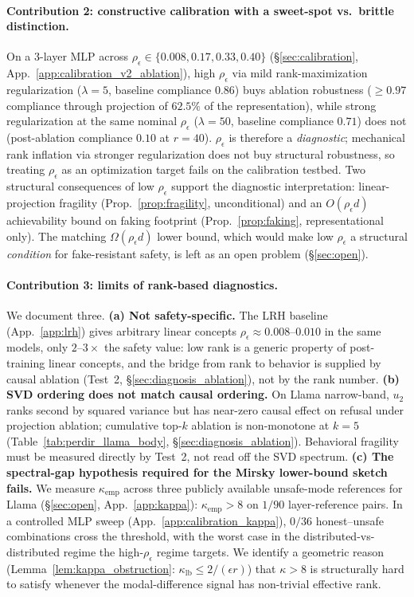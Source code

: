 \documentclass[10pt]{article}
\theoremstyle{definition}
\theoremstyle{remark}
\begin{document}
\paragraph{Contribution 2: constructive calibration with
a sweet-spot vs.\ brittle distinction.}
On a 3-layer MLP across $\rho_{\epsilon} \in \{0.008,
0.17, 0.33, 0.40\}$
(\S\ref{sec:calibration},
App.~\ref{app:calibration_v2_ablation}), high
$\rho_{\epsilon}$ via mild rank-maximization
regularization ($\lambda=5$, baseline compliance $0.86$)
buys ablation robustness ($\geq 0.97$ compliance
through projection of $62.5\%$ of the representation),
while strong regularization at the same nominal
$\rho_{\epsilon}$ ($\lambda=50$, baseline compliance
$0.71$) does not (post-ablation compliance $0.10$ at
$r=40$).  $\rho_{\epsilon}$ is therefore a
\emph{diagnostic}; mechanical rank inflation via stronger
regularization does not buy structural robustness, so
treating $\rho_{\epsilon}$ as an optimization target
fails on the calibration testbed.
Two structural consequences of low $\rho_{\epsilon}$
support the diagnostic interpretation:
linear-projection fragility
(Prop.~\ref{prop:fragility}, unconditional) and an
$O(\rho_{\epsilon}d)$ achievability bound on faking
footprint
(Prop.~\ref{prop:faking}, representational only).  The
matching $\Omega(\rho_{\epsilon}d)$ lower bound, which
would make low $\rho_{\epsilon}$ a structural
\emph{condition} for fake-resistant safety, is left as
an open problem (\S\ref{sec:open}).

\paragraph{Contribution 3: limits of rank-based
diagnostics.}
We document three.  \textbf{(a) Not safety-specific.}
The LRH baseline (App.~\ref{app:lrh}) gives arbitrary
linear concepts $\rho_{\epsilon} \approx 0.008$--$0.010$
in the same models, only $2$--$3\times$ the safety
value: low rank is a generic property of post-training
linear concepts, and the bridge from rank to behavior
is supplied by causal ablation (Test~2,
\S\ref{sec:diagnosis_ablation}), not by the rank number.
\textbf{(b) SVD ordering does not match causal
ordering.}  On Llama narrow-band, $u_2$ ranks second by
squared variance but has near-zero causal effect
on refusal under projection ablation; cumulative
top-$k$ ablation is non-monotone at $k=5$
(Table~\ref{tab:perdir_llama_body},
\S\ref{sec:diagnosis_ablation}).  Behavioral fragility
must be measured directly by Test~2, not read off the
SVD spectrum.
\textbf{(c) The spectral-gap hypothesis required for the
Mirsky lower-bound sketch fails.}  We measure
$\kappa_{\mathrm{emp}}$ across three publicly available
unsafe-mode references for Llama (\S\ref{sec:open},
App.~\ref{app:kappa}): $\kappa_{\mathrm{emp}}>8$ on
$1/90$ layer-reference pairs.  In a controlled MLP
sweep (App.~\ref{app:calibration_kappa}), $0/36$
honest--unsafe combinations cross the threshold, with
the worst case in the distributed-vs-distributed regime
the high-$\rho_{\epsilon}$ regime targets.  We
identify a geometric reason
(Lemma~\ref{lem:kappa_obstruction}:
$\kappa_{\mathrm{lb}}\leq 2/(\epsilon r)$) that
$\kappa>8$ is structurally hard to satisfy whenever the
modal-difference signal has non-trivial effective rank.
\end{document}
